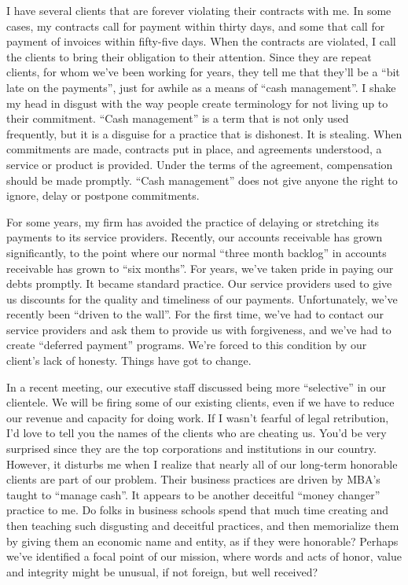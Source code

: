 \documentclass[12pt]{memoir}
\begin{document}
I have several clients that are forever violating their contracts
with me. In some cases, my contracts call for payment within thirty
days, and some that call for payment of invoices within fifty-five
days. When the contracts are violated, I call the clients to bring
their obligation to their attention. Since they are repeat clients,
for whom we've been working for years, they tell me that they'll be
a ``bit late on the payments'', just for awhile as a means of ``cash
management''. I shake my head in disgust with the way people create
terminology for not living up to their commitment. ``Cash management''
is a term that is not only used frequently, but it is a disguise for
a practice that is dishonest. It is stealing. When commitments are
made, contracts put in place, and agreements understood, a service
or product is provided. Under the terms of the agreement, compensation
should be made promptly. ``Cash management'' does not give anyone
the right to ignore, delay or postpone commitments. 

For some years, my firm has avoided the practice of delaying or stretching
its payments to its service providers. Recently, our accounts receivable
has grown significantly, to the point where our normal ``three month
backlog'' in accounts receivable has grown to ``six months''. For
years, we've taken pride in paying our debts promptly. It became standard
practice. Our service providers used to give us discounts for the
quality and timeliness of our payments. Unfortunately, we've recently
been ``driven to the wall''. For the first time, we've had to contact
our service providers and ask them to provide us with forgiveness,
and we've had to create ``deferred payment'' programs. We're forced
to this condition by our client's lack of honesty. Things have got
to change.

In a recent meeting, our executive staff discussed being more ``selective''
in our clientele. We will be firing some of our existing clients,
even if we have to reduce our revenue and capacity for doing work.
If I wasn't fearful of legal retribution, I'd love to tell you the
names of the clients who are cheating us. You'd be very surprised
since they are the top corporations and institutions in our country.
However, it disturbs me when I realize that nearly all of our long-term
honorable clients are part of our problem. Their business practices
are driven by MBA's taught to ``manage cash''. It appears to be
another deceitful ``money changer'' practice to me. Do folks in
business schools spend that much time creating and then teaching such
disgusting and deceitful practices, and then memorialize them by giving
them an economic name and entity, as if they were honorable? Perhaps
we've identified a focal point of our mission, where words and acts
of honor, value and integrity might be unusual, if not foreign, but
well received? 
\end{document}
